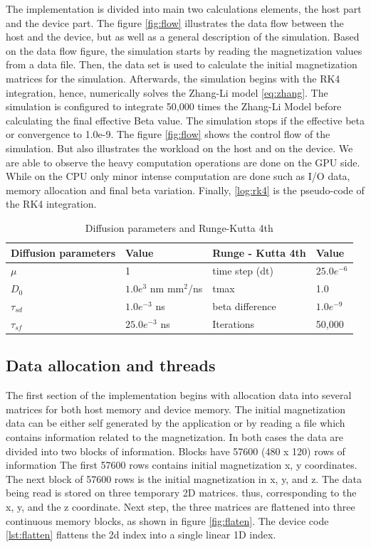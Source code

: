 The implementation is divided into main two calculations elements, the host part and the device part. The figure \ref{fig:flow} illustrates the data flow between the host and the device, but as well as a general description of the simulation. Based on the data flow figure, the simulation starts by reading the magnetization values from a data file. Then, the data set is used to calculate the initial magnetization matrices for the simulation. Afterwards, the simulation begins with the RK4 integration, hence, numerically solves the Zhang-Li model \ref{eq:zhang}. The simulation is configured to integrate 50,000 times the Zhang-Li Model before calculating the final effective Beta value. The simulation stops if the effective beta or convergence to 1.0e-9. The figure \ref{fig:flow} shows the control flow of the simulation. But also illustrates the workload on the host and on the device. We are able to observe the heavy computation operations are done on the GPU side. While on the CPU only minor intense computation are done such as I/O data, memory allocation and final beta variation. Finally, \ref{log:rk4} is the pseudo-code of the RK4 integration.

\begin{table}[h]
\centering
\begin{tabular}{| l | l | l | l |}
\hline
Diffusion parameters& Value & Runge - Kutta 4th & Value \\
\hline 
$\mu$ & 1 &  time step (dt) &   $25.0e^{-6}$   \\
\hline
$D_{0}$ & $1.0e^{3}$ nm mm$^2$/ns  & tmax  & 1.0  \\
\hline
$\tau_{sd}$ & $1.0e^{-3}$ ns  & beta difference & $1.0e^{-9}$ \\
\hline
$\tau_{sf}$ & $25.0e^{-3}$ ns  & Iterations & 50,000 \\
\hline
\end{tabular}
\caption{Diffusion parameters and Runge-Kutta 4th}
\label{tab:drk}
\end{table}

\subsection{Data allocation and threads}

The first section of the implementation begins with allocation data into several matrices for both host memory and device memory. The initial magnetization data can be either self generated by the application or by reading a file which contains information related to the magnetization. In both cases the data are divided into two blocks of information. Blocks have 57600 (480 x 120) rows of information The first 57600 rows contains initial magnetization x, y coordinates. The next block of 57600 rows is the initial magnetization in x, y, and z. The data being read is stored on three temporary 2D matrices. thus, corresponding to the x, y, and the z coordinate. Next step, the three matrices are flattened into three continuous memory blocks, as shown in figure \ref{fig:flaten}. The device code \ref{lst:flatten} flattens the 2d index into a single linear 1D index.

